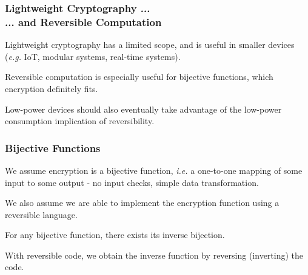 \documentclass{beamer}
\newcommand{\highlight}[1]{{\color{humblue1}#1}}
\newcommand{\ie}{\emph{i.e.}\xspace}
\newcommand{\eg}{\emph{e.g.}\xspace}
\begin{document}
\addtocounter{page}{1}
\begin{frame}
\addtocounter{page}{-1}
\frametitle{Lightweight Cryptography ...\\ \hspace*{120pt} ... and Reversible Computation}

\pause

\begin{block}{}
Lightweight cryptography has a limited scope, and is useful in smaller devices (\eg IoT, modular systems, real-time systems).
\end{block}

\pause

\begin{block}{}

Reversible computation is especially useful for bijective functions, 
which encryption definitely fits. 

\end{block}


\pause 
Low-power devices should also eventually take advantage of the low-power consumption implication of reversibility.

\end{frame}


\addtocounter{page}{1}
\begin{frame}
\addtocounter{page}{-1}
\frametitle{Bijective Functions}

\begin{block}{} 

We assume encryption is a bijective function, \ie a one-to-one mapping 
of some input to some output - no input checks, simple data 
transformation. 

We also assume we are able to implement the encryption function using a reversible language.

\end{block}

\pause
\vspace{5mm}
For any bijective function, there exists its inverse bijection.

\pause
\vspace{5mm}
\highlight{With reversible code, we obtain the inverse function by reversing (inverting) the code.}

\end{frame}
\end{document}
